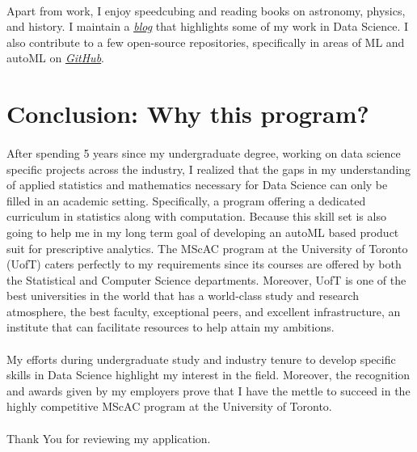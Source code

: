 \documentclass[letterpaper]{article}
\begin{document}
\paragraph{}
Apart from work, I enjoy speedcubing and reading books on astronomy, physics, and history. I maintain a \href{https://praths007.github.io/}{\it \underline{blog}} that highlights some of my work in Data Science. I also contribute to a
few open-source repositories, specifically in areas of ML and autoML on  \href{https://github.com/praths007/}{\it \underline{GitHub}}.


\section*{Conclusion: Why this program?}
\paragraph{}
After spending 5 years since my undergraduate degree, working on data science specific projects across the industry, I realized that the gaps in my understanding of applied statistics and mathematics necessary for Data Science can only be filled in an academic setting. Specifically, a program offering a dedicated curriculum in statistics along with computation. Because this skill set is also going to help me in my long term goal of developing an autoML based product suit for prescriptive analytics. The MScAC program at the University of Toronto (UofT) caters perfectly to my requirements since its courses are offered by both the Statistical and Computer Science departments. Moreover, UofT is one of the best universities in the world that has a world-class study and research atmosphere, the best faculty, exceptional peers, and excellent infrastructure, an institute that can facilitate resources to help attain my ambitions.

\paragraph{}
My efforts during undergraduate study and industry tenure to develop specific skills in Data Science highlight my interest in the field. Moreover, the recognition and awards given by my employers prove that I have the mettle to succeed in the highly competitive MScAC program at the University of Toronto.

\paragraph{}
Thank You for reviewing my application. 

  
\end{document}
